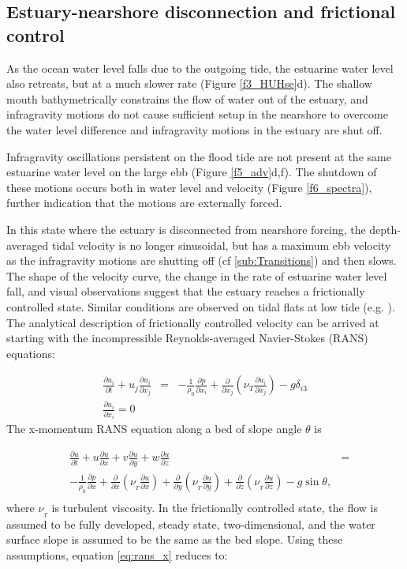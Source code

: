 \subsection{Estuary-nearshore disconnection and frictional control}

As the ocean water level falls due to the outgoing tide, the estuarine
water level also retreats, but at a much slower rate (Figure \ref{f3_HUHse}d).
The shallow mouth bathymetrically constrains the flow of water out
of the estuary, and infragravity motions do not cause sufficient setup
in the nearshore to overcome the water level difference and infragravity
motions in the estuary are shut off. 

Infragravity oscillations persistent on the flood tide are not present
at the same estuarine water level on the large ebb (Figure \ref{f5_adv}d,f).
The shutdown of these motions occurs both in water level and velocity
(Figure \ref{f6_spectra}), further indication that the motions are
externally forced.

In this state where the estuary is disconnected from nearshore forcing,
the depth-averaged tidal velocity is no longer sinusoidal, but has
a maximum ebb velocity as the infragravity motions are shutting off
(cf \ref{sub:Transitions}) and then slows. The shape of the velocity
curve, the change in the rate of estuarine water level fall, and visual
observations suggest that the estuary reaches a frictionally controlled
state. Similar conditions are observed on tidal flats at low tide
(e.g. \cite{ralston_effects_2013}). The analytical description
of frictionally controlled velocity can be arrived at starting with
the incompressible Reynolds-averaged Navier-Stokes (RANS) equations:

\begin{eqnarray}
\frac{\partial u_{i}}{\partial t}+u_{j}\frac{\partial u_{i}}{\partial x_{j}} & = & -\frac{1}{\rho_{0}}\frac{\partial p}{\partial x_{i}}+\frac{\partial}{\partial x_{j}}\left(\nu_{T}\frac{\partial u_{i}}{\partial x_{j}}\right)-g\delta_{i3}\nonumber \\
\frac{\partial u_{i}}{\partial x_{i}}=0
\end{eqnarray}
The x-momentum RANS equation along a bed of slope angle $\theta$
is 

\begin{eqnarray}
 & \frac{\partial u}{\partial t}+u\frac{\partial u}{\partial x}+v\frac{\partial u}{\partial y}+w\frac{\partial u}{\partial z} & =\nonumber \\
 & -\frac{1}{\rho_{0}}\frac{\partial p}{\partial x}+\frac{\partial}{\partial x}\left(\nu_{_{T}}\frac{\partial u}{\partial x}\right)+\frac{\partial}{\partial y}\left(\nu_{_{T}}\frac{\partial u}{\partial y}\right)+\frac{\partial}{\partial z}\left(\nu_{_{T}}\frac{\partial u}{\partial z}\right)-g\sin\theta,\label{eq:rans_x}\\
\nonumber 
\end{eqnarray}
where $\nu_{_{T}}$ is turbulent viscosity. In the frictionally controlled
state, the flow is assumed to be fully developed, steady state, two-dimensional,
and the water surface slope is assumed to be the same as the bed slope.
Using these assumptions, equation \ref{eq:rans_x} reduces to:

